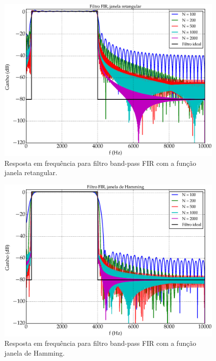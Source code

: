 \begin{figure}[H]
  \centering
  \includegraphics[scale=0.55]{images/plots/bandpass_FIR_rectangular_window}
  \caption{Resposta em frequência para filtro band-pass FIR com a função janela retangular.}
  \label{fig:bandpass_FIR_rectangular}
\end{figure}

\begin{figure}[H]
  \centering
  \includegraphics[scale=0.55]{images/plots/bandpass_FIR_hamming_window}
  \caption{Resposta em frequência para filtro band-pass FIR com a função janela de Hamming.}
  \label{fig:bandpass_FIR_hamming}
\end{figure}

